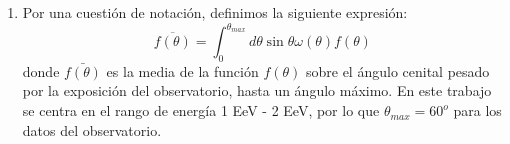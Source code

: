 \begin{enumerate}
    
      


    \item Por una cuestión de notación, definimos la siguiente expresión:
    \begin{equation}
        \overline{f(\theta)} = \int_{0}^{\theta_{max}} d\theta \sin\theta \omega(\theta) f(\theta)
        \label{eq:media_angular}
    \end{equation}
    \noindent donde $\bar{f(\theta)}$ es la media de la función $f(\theta)$ sobre el ángulo cenital pesado por la exposición del observatorio, hasta  un ángulo máximo. En este trabajo se centra en el rango de energía 1 EeV - 2 EeV, por lo que $\theta_{max}=60^o$ para los datos del observatorio. 


\end{enumerate}
